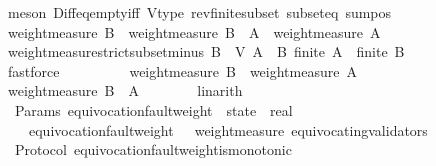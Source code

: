 \begin{isabellebody}
\ {\isacharparenleft}meson\ Diff{\isacharunderscore}eq{\isacharunderscore}empty{\isacharunderscore}iff\ V{\isacharunderscore}type\ rev{\isacharunderscore}finite{\isacharunderscore}subset\ subset{\isacharunderscore}eq\ sum{\isacharunderscore}pos{\isacharparenright}\ \ \ \ \isanewline
\ \ \isamarkupfalse%
\ {\isachardoublequoteopen}weight{\isacharunderscore}measure\ B\ {\isacharequal}\ weight{\isacharunderscore}measure\ {\isacharparenleft}B\ {\isacharminus}\ A{\isacharparenright}\ {\isacharplus}\ weight{\isacharunderscore}measure\ A{\isachardoublequoteclose}\isanewline
\ \ \ \ \isamarkupfalse%
\ weight{\isacharunderscore}measure{\isacharunderscore}strict{\isacharunderscore}subset{\isacharunderscore}minus\ {\isacartoucheopen}B\ {\isasymsubseteq}\ V{\isacartoucheclose}\ {\isacartoucheopen}A\ {\isasymsubset}\ B{\isacartoucheclose}\ {\isacartoucheopen}finite\ A\ {\isasymand}\ finite\ B{\isacartoucheclose}\isanewline
\ \ \ \ \isamarkupfalse%
\ fastforce\ \ \ \ \isanewline
\ \ \isamarkupfalse%
\ \isamarkupfalse%
\ {\isachardoublequoteopen}weight{\isacharunderscore}measure\ B\ {\isachargreater}\ weight{\isacharunderscore}measure\ A{\isachardoublequoteclose}\isanewline
\ \ \ \ \isamarkupfalse%
\ {\isacartoucheopen}weight{\isacharunderscore}measure\ {\isacharparenleft}B\ {\isacharminus}\ A{\isacharparenright}\ {\isachargreater}\ {}{\isacartoucheclose}\isanewline
\ \ \ \ \isamarkupfalse%
\ linarith\isanewline
{}\isamarkupfalse%
%
\endisatagproof
{\isafoldproof}%
%
\isadelimproof
\isanewline
%
\endisadelimproof
\isanewline
\isanewline
\isanewline
\isanewline
\isanewline
\isanewline
{}\isamarkupfalse%
\ {\isacharparenleft}\ Params{\isacharparenright}\ equivocation{\isacharunderscore}fault{\isacharunderscore}weight\ {\isacharcolon}{\isacharcolon}\ {\isachardoublequoteopen}state\ {\isasymRightarrow}\ real{\isachardoublequoteclose}\isanewline
\ \ \isanewline
\ \ \ \ \isanewline
\ \ \ \ {\isachardoublequoteopen}equivocation{\isacharunderscore}fault{\isacharunderscore}weight\ {\isasymsigma}\ {\isacharequal}\ weight{\isacharunderscore}measure\ {\isacharparenleft}equivocating{\isacharunderscore}validators\ {\isasymsigma}{\isacharparenright}{\isachardoublequoteclose}\isanewline
\isanewline
{}\isamarkupfalse%
\ {\isacharparenleft}\ Protocol{\isacharparenright}\ equivocation{\isacharunderscore}fault{\isacharunderscore}weight{\isacharunderscore}is{\isacharunderscore}monotonic\ {\isacharcolon}\isanewline

\end{isabellebody}
